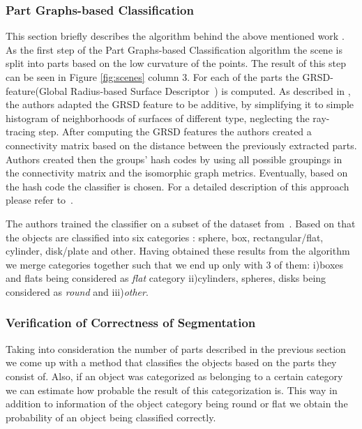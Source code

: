 
\subsubsection{Part Graphs-based Classification}
\label{sec:part-graphs}

This section briefly describes the algorithm behind the above mentioned work \cite{marton12SC}.
As the first step of the Part Graphs-based Classification algorithm the scene is split into parts based on the low curvature of the points. The result of this step can be seen in Figure \ref{fig:scenes} column 3. For each of the parts the GRSD- feature(Global Radius-based Surface Descriptor~\cite{irosws11vosch}) is computed. 
 As described in \cite{irosws11vosch}, the authors adapted the GRSD feature to be additive, by simplifying it to simple histogram of neighborhoods of surfaces of different type, neglecting the ray-tracing step. After computing the GRSD features the authors created a connectivity matrix based on the distance between the previously extracted parts. Authors created then the groups' hash codes by using all possible groupings in the connectivity matrix and the isomorphic graph metrics. Eventually, based on the hash code the classifier is chosen. For a detailed description of this approach 
please refer to~\cite{marton12SC}.
 
The authors trained the classifier on a subset of the dataset from~\cite{lai11db}. Based on that the objects are classified into six categories :  sphere, box, rectangular/flat, cylinder, disk/plate and other.
Having obtained these results from the algorithm we merge categories together such that we end up only with 3 of them: i)boxes and flats being considered as \emph{flat} category ii)cylinders, spheres, disks being considered as \emph{round} and iii)\emph{other}. 


\subsubsection{Verification of Correctness of Segmentation}
\label{sec:probabilities}

Taking into consideration the number of parts described in the previous section we come up with a method that classifies the objects based on the parts they consist of. Also, if an object was categorized as belonging to a certain category we can estimate how probable the result of this categorization is. This way in addition to information of the object category being round or flat we obtain the probability of an object being classified correctly.

